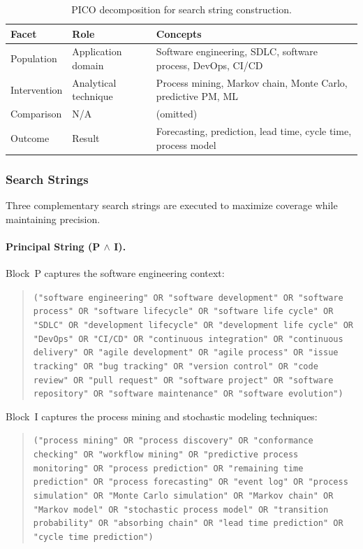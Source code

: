 \begin{table}[htbp]
\centering
\caption{PICO decomposition for search string construction.}
\label{tab:pico}
\begin{tabular}{lp{4cm}p{7cm}}
\toprule
\textbf{Facet} & \textbf{Role} & \textbf{Concepts} \\
\midrule
Population    & Application domain    & Software engineering, SDLC, software process,
                                        DevOps, CI/CD \\
Intervention  & Analytical technique  & Process mining, Markov chain, Monte Carlo,
                                        predictive PM, ML \\
Comparison    & N/A                   & (omitted) \\
Outcome       & Result                & Forecasting, prediction, lead time, cycle time,
                                        process model \\
\bottomrule
\end{tabular}
\end{table}

\subsubsection{Search Strings}

Three complementary search strings are executed to maximize coverage while
maintaining precision.

\paragraph{Principal String (P $\wedge$ I).}
Block~P captures the software engineering context:

\begin{quote}
\small
\texttt{("software engineering" OR "software development" OR "software process"
OR "software lifecycle" OR "software life cycle" OR "SDLC" OR "development
lifecycle" OR "development life cycle" OR "DevOps" OR "CI/CD" OR "continuous
integration" OR "continuous delivery" OR "agile development" OR "agile process"
OR "issue tracking" OR "bug tracking" OR "version control" OR "code review" OR
"pull request" OR "software project" OR "software repository" OR "software
maintenance" OR "software evolution")}
\end{quote}

Block~I captures the process mining and stochastic modeling techniques:

\begin{quote}
\small
\texttt{("process mining" OR "process discovery" OR "conformance checking" OR
"workflow mining" OR "predictive process monitoring" OR "process prediction" OR
"remaining time prediction" OR "process forecasting" OR "event log" OR "process
simulation" OR "Monte Carlo simulation" OR "Markov chain" OR "Markov model" OR
"stochastic process model" OR "transition probability" OR "absorbing chain" OR
"lead time prediction" OR "cycle time prediction")}
\end{quote}

